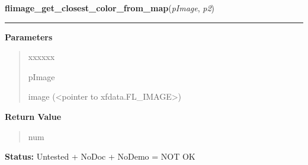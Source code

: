     \label{xformslib:flflimage:flimage_get_closest_color_from_map}

    \vspace{0.5ex}

\hspace{.8\funcindent}\begin{boxedminipage}{\funcwidth}

    \raggedright \textbf{flimage\_get\_closest\_color\_from\_map}(\textit{pImage}, \textit{p2})

    \vspace{-1.5ex}

    \rule{\textwidth}{0.5\fboxrule}
\setlength{\parskip}{2ex}
\setlength{\parskip}{1ex}
      \textbf{Parameters}
      \vspace{-1ex}

      \begin{quote}
        \begin{Ventry}{xxxxxx}

          \item[pImage]

          image ({\textless}pointer to xfdata.FL\_IMAGE{\textgreater})

        \end{Ventry}

      \end{quote}

      \textbf{Return Value}
    \vspace{-1ex}

      \begin{quote}
      num

      \end{quote}

\textbf{Status:} Untested + NoDoc + NoDemo = NOT OK



    \end{boxedminipage}

    \label{xformslib:flflimage:flimage_get_linearlut}

    \vspace{0.5ex}

